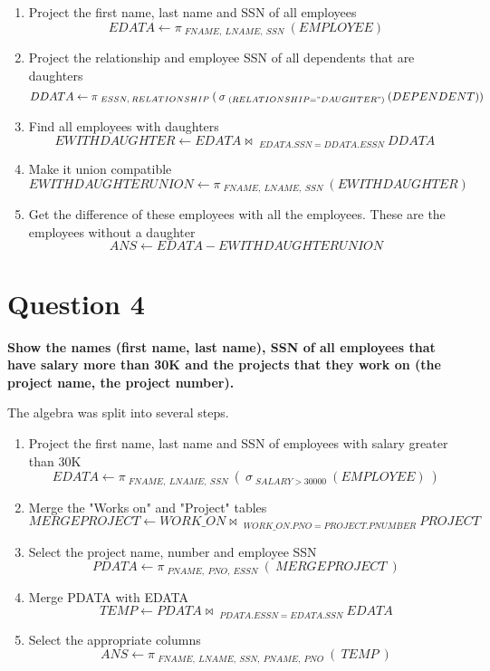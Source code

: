 \documentclass{article}
\begin{document}
    \begin{enumerate}
        \item Project the first name, last name and SSN of all employees
        \[ EDATA \gets \pi \: _{FNAME, \: LNAME, \: SSN} \: (EMPLOYEE)\]
        \item Project the relationship and employee SSN of all dependents that are daughters
        \[ DDATA \gets \pi \: _{ESSN, \: RELATIONSHIP} \: ( \: \sigma \: _{(RELATIONSHIP="DAUGHTER")} \: (DEPENDENT) ) \]
        \item Find all employees with daughters
        \[ EWITHDAUGHTER \gets EDATA \bowtie \: _{EDATA.SSN = DDATA.ESSN} \: DDATA \:  \]
        \item Make it union compatible
        \[ EWITHDAUGHTERUNION \gets \pi \: _{FNAME, \: LNAME, \: SSN} \: (EWITHDAUGHTER)\]
        \item Get the difference of these employees with all the employees. These are the employees without a daughter
        \[ ANS \gets EDATA - EWITHDAUGHTERUNION \]
    \end{enumerate}

\section{Question 4}

    \textbf{Show the names (first name, last name), SSN of all employees that have salary more than 30K and the projects that they work on (the project name, the project number).}

    The algebra was split into several steps.
    
    \begin{enumerate}
        \item Project the first name, last name and SSN of employees with salary greater than 30K
        \[ EDATA \gets \pi \: _{FNAME, \: LNAME, \: SSN} \: ( \: \sigma \: _{SALARY > 30000} \: (EMPLOYEE) \: ) \]
        \item Merge the "Works on" and "Project" tables
        \[ MERGEPROJECT \gets WORK\_ON \bowtie \: _{WORK\_ON.PNO = PROJECT.PNUMBER} \: PROJECT \]
        \item Select the project name, number and employee SSN 
        \[ PDATA \gets \pi \: _{PNAME, \: PNO, \: ESSN} \: ( \:MERGEPROJECT \:) \]
        \item Merge PDATA with EDATA
        \[ TEMP \gets PDATA \bowtie \: _{PDATA.ESSN = EDATA.SSN} \: EDATA \]
        \item Select the appropriate columns
        \[ ANS \gets \pi \: _{FNAME, \: LNAME, \: SSN, \: PNAME, \: PNO} \: ( \: TEMP \: ) \]
    \end{enumerate}
\end{document}
